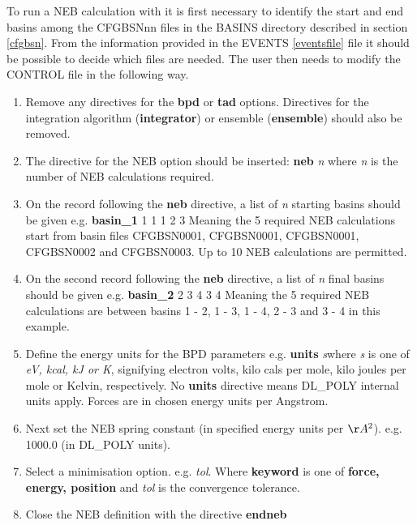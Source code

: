 To run a NEB calculation with \D{} it is first necessary to identify the
start and end basins among the CFGBSNnn files in the BASINS directory
described in section \ref{cfgbsn}. From the information provided in
the EVENTS \ref{eventsfile} file it should be possible to decide which
files are needed. The user then needs to modify the CONTROL file in
the following way.
\begin{enumerate}
\item Remove any directives for the {\bf bpd} or {\bf tad}
options. Directives for the integration algorithm ({\bf integrator}) or
ensemble ({\bf ensemble}) should also be removed.
\item The directive for the NEB option should be inserted: \newline
{\bf neb} {\em n} \newline
where {\em n} is the number of NEB calculations required.
\item On the record following the {\bf neb} directive, a list of 
{\em n} starting basins  should be given e.g.\newline
{\bf basin\_1} 1 1 1 2 3 \newline
Meaning the 5 required NEB calculations start from basin files
CFGBSN0001, CFGBSN0001, CFGBSN0001, CFGBSN0002 and CFGBSN0003. Up to
10 NEB calculations are permitted.
\item On the second record following the {\bf neb} directive, a list of 
{\em n} final basins should be given e.g.\newline
{\bf basin\_2} 2 3 4 3 4 \newline
Meaning the 5 required NEB calculations are between basins 1 - 2, 1
- 3, 1 - 4, 2 - 3 and 3 - 4 in this example.
\item Define the energy units for the BPD parameters e.g. \newline
{\bf units} {\em s}\newline where {\em s} is one of {\em eV,
kcal, kJ or K}, signifying electron volts, kilo cals per mole,
kilo joules per mole or Kelvin, respectively. No {\bf units}
directive means DL\_POLY internal units apply. Forces are in
chosen energy units per Angstrom.
\item Next set the NEB spring constant (in specified energy units per $\AA^2$). 
e.g.  1000.0 (in DL\_POLY units).
\item Select a minimisation option.  e.g. 
 {\em tol}.\newline 
Where {\bf keyword} is one of {\bf force, energy, position} and {\em
tol} is the convergence tolerance.
\item Close the NEB definition with the directive \newline
{\bf endneb}
\end{enumerate}

